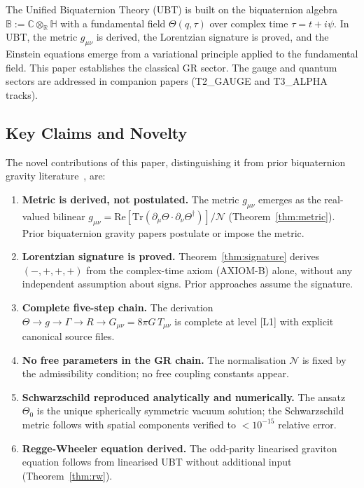 \documentclass[12pt,a4paper]{article}
\theoremstyle{definition}
\theoremstyle{remark}
\newcommand{\BB}{\mathbb{B}}
\newcommand{\CC}{\mathbb{C}}
\newcommand{\RR}{\mathbb{R}}
\newcommand{\HH}{\mathbb{H}}
\newcommand{\Tr}{\mathrm{Tr}}
\newcommand{\re}{\mathrm{Re}}
\newcommand{\calN}{\mathcal{N}}
\begin{document}
The Unified Biquaternion Theory (UBT) is built on the biquaternion algebra
$\BB := \CC\otimes_\RR\HH$ with a fundamental field
$\Theta(q,\tau)$ over complex time $\tau = t + i\psi$.
In UBT, the metric $g_{\mu\nu}$ is derived, the Lorentzian signature is proved,
and the Einstein equations emerge from a variational principle applied to
the fundamental field.
This paper establishes the classical GR sector.
The gauge and quantum sectors are addressed in companion papers
(T2\_GAUGE and T3\_ALPHA tracks).

\subsection{Key Claims and Novelty}

The novel contributions of this paper, distinguishing it from prior biquaternion
gravity literature~\cite{adler1995,finkelstein1962,deleo1996}, are:

\begin{enumerate}
  \item \textbf{Metric is derived, not postulated.}
        The metric $g_{\mu\nu}$ emerges as the real-valued bilinear
        $g_{\mu\nu} = \re[\Tr(\partial_\mu\Theta \cdot \partial_\nu\Theta^\dagger)]/\calN$
        (Theorem~\ref{thm:metric}).
        Prior biquaternion gravity papers postulate or impose the metric.

  \item \textbf{Lorentzian signature is proved.}
        Theorem~\ref{thm:signature} derives $(-,+,+,+)$ from the complex-time
        axiom (AXIOM-B) alone, without any independent assumption about signs.
        Prior approaches assume the signature.

  \item \textbf{Complete five-step chain.}
        The derivation $\Theta \to g \to \Gamma \to R \to G_{\mu\nu} = 8\pi G\,T_{\mu\nu}$
        is complete at level [L1] with explicit canonical source files.

  \item \textbf{No free parameters in the GR chain.}
        The normalisation $\calN$ is fixed by the admissibility condition;
        no free coupling constants appear.

  \item \textbf{Schwarzschild reproduced analytically and numerically.}
        The ansatz $\Theta_0$ is the unique spherically symmetric vacuum solution;
        the Schwarzschild metric follows with spatial components verified to
        $< 10^{-15}$ relative error.

  \item \textbf{Regge-Wheeler equation derived.}
        The odd-parity linearised graviton equation follows from linearised
        UBT without additional input (Theorem~\ref{thm:rw}).
\end{enumerate}
\end{document}
